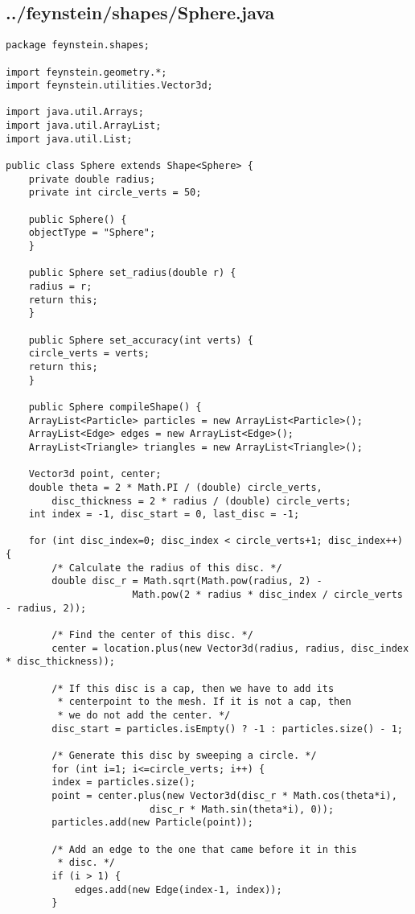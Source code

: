 \subsection*{../feynstein/shapes/Sphere.java}
\begin{lstlisting}
package feynstein.shapes;

import feynstein.geometry.*;
import feynstein.utilities.Vector3d;

import java.util.Arrays;
import java.util.ArrayList;
import java.util.List;

public class Sphere extends Shape<Sphere> {
    private double radius;
    private int circle_verts = 50;

    public Sphere() {
	objectType = "Sphere";
    }

    public Sphere set_radius(double r) {
	radius = r;
	return this;
    }

    public Sphere set_accuracy(int verts) {
	circle_verts = verts;
	return this;
    }

    public Sphere compileShape() {
	ArrayList<Particle> particles = new ArrayList<Particle>();
	ArrayList<Edge> edges = new ArrayList<Edge>();
	ArrayList<Triangle> triangles = new ArrayList<Triangle>();

	Vector3d point, center;
	double theta = 2 * Math.PI / (double) circle_verts, 
	    disc_thickness = 2 * radius / (double) circle_verts;
	int index = -1, disc_start = 0, last_disc = -1;

	for (int disc_index=0; disc_index < circle_verts+1; disc_index++) {
	    /* Calculate the radius of this disc. */
	    double disc_r = Math.sqrt(Math.pow(radius, 2) - 
				      Math.pow(2 * radius * disc_index / circle_verts - radius, 2));

	    /* Find the center of this disc. */
	    center = location.plus(new Vector3d(radius, radius, disc_index * disc_thickness));

	    /* If this disc is a cap, then we have to add its
	     * centerpoint to the mesh. If it is not a cap, then
	     * we do not add the center. */
	    disc_start = particles.isEmpty() ? -1 : particles.size() - 1;
		
	    /* Generate this disc by sweeping a circle. */
	    for (int i=1; i<=circle_verts; i++) {
		index = particles.size();
		point = center.plus(new Vector3d(disc_r * Math.cos(theta*i),
						 disc_r * Math.sin(theta*i), 0));
		particles.add(new Particle(point));

		/* Add an edge to the one that came before it in this
		 * disc. */
		if (i > 1) {
		    edges.add(new Edge(index-1, index));
		}


\end{lstlisting}
